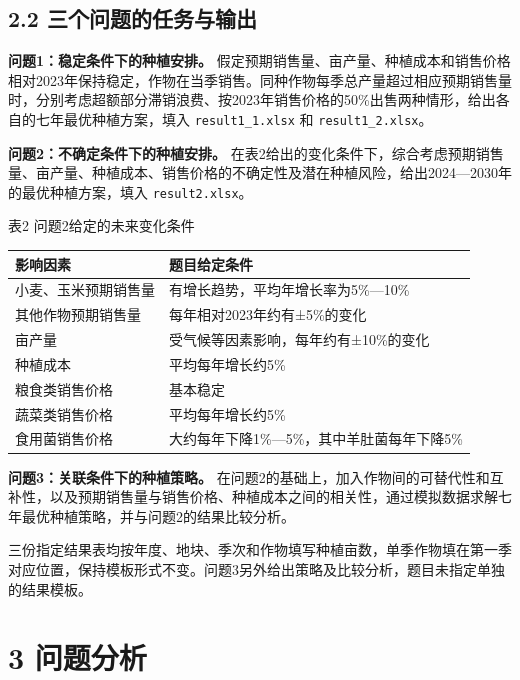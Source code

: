 \documentclass[11pt,a4paper]{article}
\begin{document}
\subsection*{2.2 三个问题的任务与输出}
\textbf{问题1：稳定条件下的种植安排。} 假定预期销售量、亩产量、种植成本和销售价格相对2023年保持稳定，作物在当季销售。同种作物每季总产量超过相应预期销售量时，分别考虑超额部分滞销浪费、按2023年销售价格的50\%出售两种情形，给出各自的七年最优种植方案，填入 \texttt{result1\_1.xlsx} 和 \texttt{result1\_2.xlsx}。\par
\textbf{问题2：不确定条件下的种植安排。} 在表2给出的变化条件下，综合考虑预期销售量、亩产量、种植成本、销售价格的不确定性及潜在种植风险，给出2024—2030年的最优种植方案，填入 \texttt{result2.xlsx}。\par
\par\smallskip\noindent\begin{minipage}{\linewidth}
{\centering\small 表2 问题2给定的未来变化条件\par}\smallskip
{\fontsize{10.5}{14}\selectfont\renewcommand{\arraystretch}{1.22}\begin{tabularx}{\linewidth}{>{\raggedright\arraybackslash}p{4.3cm}>{\raggedright\arraybackslash}X}\toprule
影响因素 & 题目给定条件 \\
\midrule
小麦、玉米预期销售量 & 有增长趋势，平均年增长率为5\%—10\% \\
其他作物预期销售量 & 每年相对2023年约有±5\%的变化 \\
亩产量 & 受气候等因素影响，每年约有±10\%的变化 \\
种植成本 & 平均每年增长约5\% \\
粮食类销售价格 & 基本稳定 \\
蔬菜类销售价格 & 平均每年增长约5\% \\
食用菌销售价格 & 大约每年下降1\%—5\%，其中羊肚菌每年下降5\% \\
\bottomrule\end{tabularx}}\end{minipage}\par\smallskip
\textbf{问题3：关联条件下的种植策略。} 在问题2的基础上，加入作物间的可替代性和互补性，以及预期销售量与销售价格、种植成本之间的相关性，通过模拟数据求解七年最优种植策略，并与问题2的结果比较分析。\par
三份指定结果表均按年度、地块、季次和作物填写种植亩数，单季作物填在第一季对应位置，保持模板形式不变。问题3另外给出策略及比较分析，题目未指定单独的结果模板。\par
\section*{3 问题分析}
\end{document}
